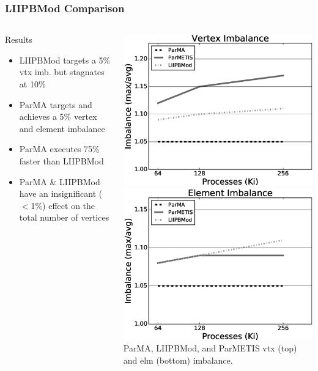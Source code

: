 \documentclass{beamer}
\begin{document}
\begin{frame}
  \frametitle{LIIPBMod Comparison}
  \begin{columns} 
    \begin{column}{0.5\textwidth}
      Results
      \begin{itemize}
        \item LIIPBMod targets a 5\% vtx imb. but stagnates at 10\%
        \item ParMA targets and achieves a 5\% vertex and element imbalance
        \item ParMA executes 75\% faster than LIIPBMod
        \item ParMA \& LIIPBMod have an insignificant ($<$1\%) effect on the total
          number of vertices
      \end{itemize}
    \end{column}
    \begin{column}{0.5\textwidth}
      \centering
      \includegraphics[width=.8\textwidth]{../parmaimprovement/results/liipbmod-v-parma/vtxImb.eps}\\
      \includegraphics[width=.8\textwidth]{../parmaimprovement/results/liipbmod-v-parma/elmImb.eps}\\
      \small
      ParMA, LIIPBMod, and ParMETIS vtx (top) and elm (bottom) imbalance.
    \end{column}
  \end{columns}
\end{frame}
\end{document}
